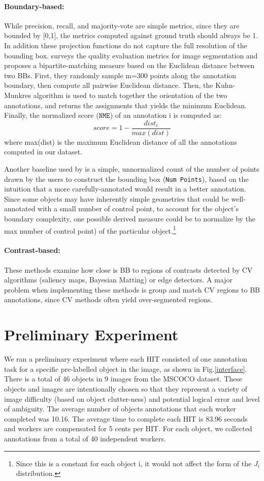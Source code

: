 \documentclass[12pt]{article}
\begin{document}
\paragraph{Boundary-based:} \par While precision, recall, and majority-vote are simple metrics, since they are bounded by [0,1], the metrics computed against ground truth should always be 1. In addition these projection functions do not capture the full resolution of the bounding box.  \cite{Vittayakorn2011} surveys the quality evaluation metrics for image segmentation  and proposes a bipartite-matching measure based on the Euclidean distance between two BBs. First, they randomly sample m=300 points along the annotation boundary, then compute all pairwise Euclidean distance. Then, the Kuhn-Munkres algorithm is used to match together the orientation of the two annotations, and returns the assignments that yields the minimum Euclidean. Finally, the normalized score ($\texttt{NME}$) of an annotation i is computed as:
\begin{equation}
score = 1-\frac{dist_i}{max(dist)}
\end{equation} where max(dist) is the maximum Euclidean distance of all the annotations computed in our dataset.
\par  Another baseline used by \cite{Vittayakorn2011} is a simple, unnormalized count of the number of points drawn by the users to construct the bounding box (\texttt{Num Points}), based on the intuition that a more carefully-annotated would result in a better annotation. Since some objects may have inherently simple geometries that could be well-annotated with a small number of control point, to account for the object's boundary complexity, one possible derived measure could be to normalize by the max number of control point) of the particular object.\footnote{Since this is a constant for each object i, it would not affect the form of the $J_i$ distribution.} 
\paragraph{Contrast-based: } These methods examine how close is BB to regions of contrasts detected by CV algorithms (saliency maps, Bayesian Matting) or edge detectors. A major problem when implementing these methods is group and match CV regions to BB annotations, since CV methods often yield over-segmented regions.
\section{Preliminary Experiment}
We ran a preliminary experiment where each HIT consisted of one annotation task for a specific pre-labelled object in the image, as shown in Fig.\ref{interface}. There is a total of 46 objects in 9 images from the MSCOCO dataset\cite{Lin2014}. These objects and images are intentionally chosen so that they represent a variety of image difficulty (based on object clutter-ness) and potential logical error and level of ambiguity. The average number of objects annotations that each worker completed was 10.16. The average time to complete each HIT is 83.96 seconds and workers are compensated for 5 cents per HIT.  For each object, we collected annotations from a total of 40 independent workers.
\end{document}
